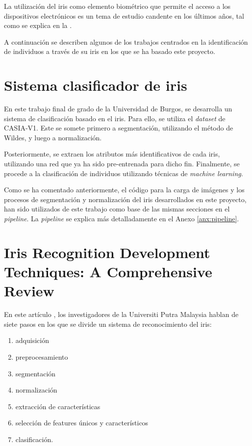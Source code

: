  \label{capitulo6}

La utilización del iris como elemento biométrico que permite el acceso a los dispositivos electrónicos es un tema de estudio candente en los últimos años, 
tal como se explica en la .

A continuación se describen algunos de los trabajos centrados en la identificación de individuos a través de su iris en los que se ha basado este proyecto.

\section{Sistema clasificador de iris}

En este trabajo final de grado\cite{tfg_iris_2020} de la Universidad de Burgos, se desarrolla un sistema de clasificación basado en el iris. Para ello, se utiliza el \textit{dataset} 
de CASIA-V1. Este se somete primero a segmentación, utilizando el método de Wildes, y luego a normalización. 

Posteriormente, se extraen los atributos más identificativos de cada iris,
 utilizando una red que ya ha sido pre-entrenada para dicho fin\cite{lozej_end--end_2018}. Finalmente, se procede a la clasificación de individuos utilizando técnicas de \textit{machine learning}.

Como se ha comentado anteriormente, el código para la carga de imágenes y los procesos de segmentación y normalización del iris desarrollados en este proyecto, han sido utilizados de este trabajo como 
base de las mismas secciones en el \textit{pipeline}. La \textit{pipeline} se explica más detalladamente en el Anexo \ref{anx:pipeline}.

\section{Iris Recognition Development Techniques: A Comprehensive Review}

En este artículo \cite{malgheet_iris_2021}, los investigadores de la Universiti Putra Malaysia hablan de siete pasos en los que se divide un sistema de reconocimiento del iris:
\begin{enumerate}
\item adquisición
\item preprocesamiento
\item segmentación
\item normalización
\item extracción de características
\item selección de features únicos y característicos
\item clasificación. 
\end{enumerate}
 
